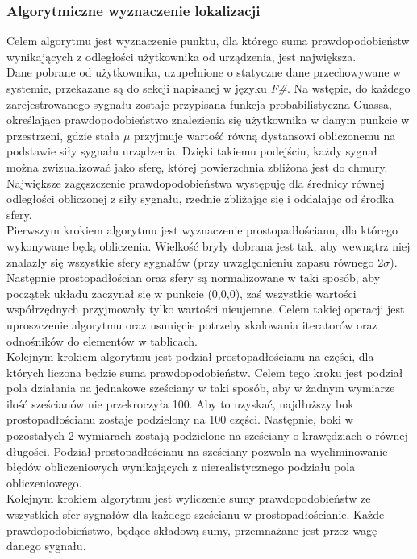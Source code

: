 \subsubsection{Algorytmiczne wyznaczenie lokalizacji}
Celem algorytmu jest wyznaczenie punktu, dla którego suma prawdopodobieństw wynikających z odległości użytkownika od urządzenia, jest największa.\\
Dane pobrane od użytkownika, uzupełnione o statyczne dane przechowywane w systemie, przekazane są do sekcji napisanej w języku \textit{F\#}. Na wstępie, do każdego zarejestrowanego sygnału zostaje przypisana funkcja probabilistyczna Guassa, określająca prawdopodobieństwo znalezienia się użytkownika w danym punkcie w przestrzeni, gdzie stała $\mu$ przyjmuje wartość równą dystansowi obliczonemu na podstawie siły sygnału urządzenia. Dzięki takiemu podejściu, każdy sygnał można zwizualizować jako sferę, której powierzchnia zbliżona jest do chmury. Największe zagęszczenie prawdopodobieństwa występuję dla średnicy równej odległości obliczonej z siły sygnału, rzednie zbliżając się i oddalając od środka sfery.\\
Pierwszym krokiem algorytmu jest wyznaczenie prostopadłościanu, dla którego wykonywane będą obliczenia. Wielkość bryły dobrana jest tak, aby wewnątrz niej znalazły się wszystkie sfery sygnałów (przy uwzględnieniu zapasu równego 2$\sigma$). Następnie prostopadłościan oraz sfery są normalizowane w taki sposób, aby początek układu zaczynał się w punkcie (0,0,0), zaś wszystkie wartości współrzędnych przyjmowały tylko wartości nieujemne. Celem takiej operacji jest uproszczenie algorytmu oraz usunięcie potrzeby skalowania iteratorów oraz odnośników do elementów w tablicach.\\
Kolejnym krokiem algorytmu jest podział prostopadłościanu na części, dla których liczona będzie suma prawdopodobieństw. Celem tego kroku jest podział pola działania na jednakowe sześciany w taki sposób, aby w żadnym wymiarze ilość sześcianów nie przekroczyła 100. Aby to uzyskać, najdłuższy bok prostopadłościanu zostaje podzielony na 100 części. Następnie, boki w pozostałych 2 wymiarach zostają podzielone na sześciany o krawędziach o równej długości. Podział prostopadłościanu na sześciany pozwala na wyeliminowanie błędów obliczeniowych wynikających z nierealistycznego podziału pola obliczeniowego.\\
Kolejnym krokiem algorytmu jest wyliczenie sumy prawdopodobieństw ze wszystkich sfer sygnałów dla każdego sześcianu w prostopadłościanie. Każde prawdopodobieństwo, będące składową sumy, przemnażane jest przez wagę danego sygnału.		
